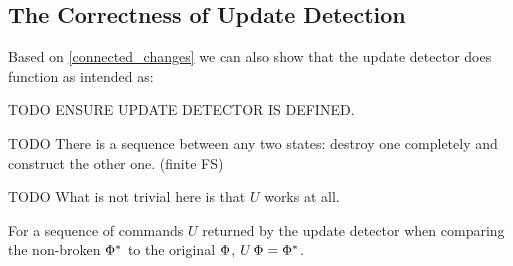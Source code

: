 
\subsection{The Correctness of Update Detection}

Based on \cref{connected_changes} we can also show that
the update detector does function as intended as:

TODO ENSURE UPDATE DETECTOR IS DEFINED.

TODO There is a sequence between any two states: destroy one completely and construct the other one. (finite FS)

TODO What is not trivial here is that $U$ works at all.

\begin{myth}
For a sequence of commands $U$ returned by the update detector
when comparing the non-broken $\Phi^*$ to the original $\Phi$,
$U\,\Phi = \Phi^*$.
\end{myth}
